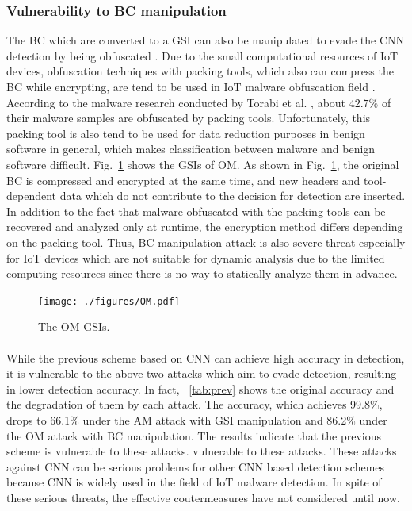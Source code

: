 \documentclass{ieeeaccess}
\newcommand{\myfigurename}{Fig.}
\begin{document}
\subsubsection{Vulnerability to BC manipulation}
The BC which are converted to a GSI can also be manipulated to evade the CNN detection by being obfuscated \cite{om}.
Due to the small computational resources of IoT devices, obfuscation techniques with packing tools, which also can compress the BC while encrypting, are tend to be used in IoT malware obfuscation field \cite{zako, attack2}.
According to the malware research conducted by Torabi et al. \cite{zako}, about $42.7\%$ of their malware samples are obfuscated by packing tools.
Unfortunately, this packing tool is also tend to be used for data reduction purposes in benign software in general, which makes classification between malware and benign software difficult.
\myfigurename~\ref{fig:omGSI} shows the GSIs of OM.
As shown in \myfigurename~\ref{fig:omGSI}, the original BC is compressed and encrypted at the same time, and new headers and tool-dependent data which do not contribute to the decision for detection are inserted.
In addition to the fact that malware obfuscated with the packing tools can be recovered and analyzed only at runtime, the encryption method differs depending on the packing tool.
Thus, BC manipulation attack is also severe threat especially for IoT devices which are not suitable for dynamic analysis due to the limited computing resources since there is no way to statically analyze them in advance.

\begin{figure}[t]
 \centering
 \texttt{[image: ./figures/OM.pdf]}
 \caption{The OM GSIs.} 
 \label{fig:omGSI}
\end{figure}

\paragraph*{}
While the previous scheme based on CNN can achieve high accuracy in detection, it is vulnerable to the above two attacks which aim to evade detection, resulting in lower detection accuracy.
In fact, \tablename~\ref{tab:prev} shows the original accuracy and the degradation of them by each attack.
The accuracy, which achieves 99.8\%, drops to 66.1\% under the AM attack with GSI manipulation and 86.2\% under the OM attack with BC manipulation.
The results indicate that the previous scheme is vulnerable to these attacks.
vulnerable to these attacks.
These attacks against CNN can be serious problems for other CNN based detection schemes because CNN is widely used in the field of IoT malware detection.
In spite of these serious threats, the effective coutermeasures have not considered until now.
\end{document}
